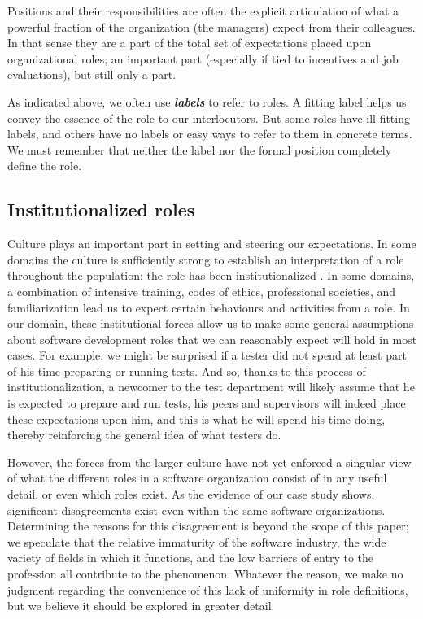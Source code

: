 \documentclass[10pt, conference, compsocconf]{IEEEtran}
\begin{document}
Positions and their responsibilities are often the explicit articulation of what a powerful fraction of the organization (the managers) expect from their colleagues. In that sense they are a part of the total set of expectations placed upon organizational roles; an important part (especially if tied to incentives and job evaluations), but still only a part.

As indicated above, we often use \textbf{\emph{labels}} to refer to roles. A fitting label helps us convey the essence of the role to our interlocutors. But some roles have ill-fitting labels, and others have no labels or easy ways to refer to them in concrete terms. We must remember that neither the label nor the formal position completely define the role.


\subsection{Institutionalized roles}

Culture plays an important part in setting and steering our expectations. In some domains the culture is sufficiently strong to establish an interpretation of a role throughout the population: the role has been institutionalized \cite{DiMaggio1991}. In some domains, a combination of intensive training, codes of ethics, professional societies, and familiarization lead us to expect certain behaviours and activities from a role. In our domain, these institutional forces allow us to make some general assumptions about software development roles that we can reasonably expect will hold in most cases. For example, we might be surprised if a tester did not spend at least part of his time preparing or running tests. And so, thanks to this process of institutionalization, a newcomer to the test department will likely assume that he is expected to prepare and run tests, his peers and supervisors will indeed place these expectations upon him, and this is what he will spend his time doing, thereby reinforcing the general idea of what testers do.

However, the forces from the larger culture have not yet enforced a singular view of what the different roles in a software organization consist of in any useful detail, or even which roles exist. As the evidence of our case study shows, significant disagreements exist even within the same software organizations. Determining the reasons for this disagreement is beyond the scope of this paper; we speculate that the relative immaturity of the software industry, the wide variety of fields in which it functions, and the low barriers of entry to the profession all contribute to the phenomenon. Whatever the reason, we make no judgment regarding the convenience of this lack of uniformity in role definitions, but we believe it should be explored in greater detail.
\end{document}
